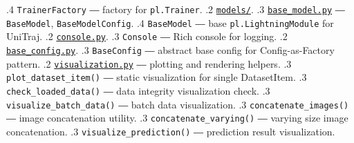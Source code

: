 {.4 \texttt{TrainerFactory} ― factory for \texttt{pl.Trainer}.
.2 \href{https://github.com/JanDuchscherer104/UniTraj/blob/main/unitraj/models/}{\texttt{models/}}.
.3 \href{https://github.com/JanDuchscherer104/UniTraj/blob/main/unitraj/models/base_model/base_model.py}{\texttt{base\_model.py}} ― \texttt{BaseModel}, \texttt{BaseModelConfig}.
.4 \texttt{BaseModel} ― base \texttt{pl.LightningModule} for UniTraj.
.2 \href{https://github.com/JanDuchscherer104/UniTraj/blob/main/unitraj/utils/console.py}{\texttt{console.py}}.
.3 \texttt{Console} ― Rich console for logging.
.2 \href{https://github.com/JanDuchscherer104/UniTraj/blob/main/unitraj/utils/base_config.py}{\texttt{base\_config.py}}.
.3 \texttt{BaseConfig} ― abstract base config for Config-as-Factory pattern.
.2 \href{https://github.com/JanDuchscherer104/UniTraj/blob/main/unitraj/utils/visualization.py}{\texttt{visualization.py}} ― plotting and rendering helpers.
.3 \texttt{plot\_dataset\_item()} ― static visualization for single DatasetItem.
.3 \texttt{check\_loaded\_data()} ― data integrity visualization check.
.3 \texttt{visualize\_batch\_data()} ― batch data visualization.
.3 \texttt{concatenate\_images()} ― image concatenation utility.
.3 \texttt{concatenate\_varying()} ― varying size image concatenation.
.3 \texttt{visualize\_prediction()} ― prediction result visualization.
}

